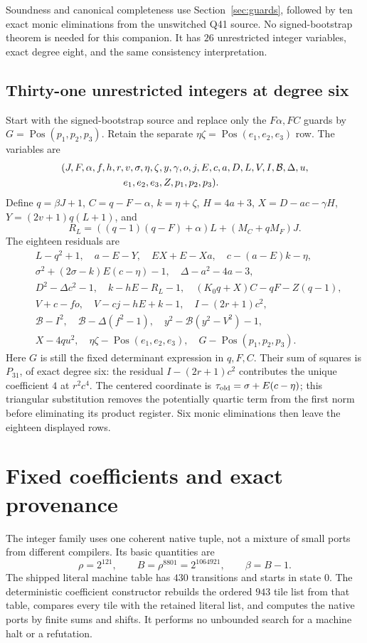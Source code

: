 \documentclass[11pt]{article}
\newcommand{\Pos}{\operatorname{Pos}}
\begin{document}
Soundness and canonical completeness use Section~\ref{sec:guards}, followed
by ten exact monic eliminations from the unswitched Q41 source. No
signed-bootstrap theorem is needed for this companion. It has $26$
unrestricted integer variables, exact degree eight, and the same consistency
interpretation.

\subsection{Thirty-one unrestricted integers at degree six}
Start with the signed-bootstrap source and replace only the $F\alpha,FC$
guards by $G=\Pos(p_1,p_2,p_3)$. Retain the separate
$\eta\zeta=\Pos(e_1,e_2,e_3)$ row. The variables are
\[
\begin{split}
 &(J,F,\alpha,f,h,r,v,\sigma,\eta,\zeta,y,\gamma,o,j,E,c,a,D,L,V,I,\mathcal B,\Delta,u,\\
 &\hspace{22mm}e_1,e_2,e_3,Z,p_1,p_2,p_3).
\end{split}
\]
Define $q=\beta J+1$, $C=q-F-\alpha$, $k=\eta+\zeta$,
$H=4a+3$, $X=D-ac-\gamma H$, $Y=(2v+1)q(L+1)$, and
\[
 R_L=((q-1)(q-F)+\alpha)L+(M_C+qM_F)J.
\]
The eighteen residuals are
\begin{align*}
 &L-q^2+1,\quad a-E-Y,\quad EX+E-Xa,\quad c-(a-E)k-\eta,\\
 &\sigma^2+(2\sigma-k)E(c-\eta)-1,\quad\Delta-a^2-4a-3,\\
 &D^2-\Delta c^2-1,\quad k-hE-R_L-1,\quad
 (K_0q+X)C-qF-Z(q-1),\\
 &V+c-fo,\quad V-cj-hE+k-1,\quad I-(2r+1)c^2,\\
 &\mathcal B-I^2,\quad\mathcal B-\Delta(f^2-1),\quad
 y^2-\mathcal B(y^2-V^2)-1,\\
 &X-4qu^2,\quad\eta\zeta-\Pos(e_1,e_2,e_3),\quad
 G-\Pos(p_1,p_2,p_3).
\end{align*}
Here $G$ is still the fixed determinant expression in $q,F,C$.
Their sum of squares is $P_{31}$, of exact degree six: the residual
$I-(2r+1)c^2$ contributes the unique coefficient $4$ at $r^2c^4$.
The centered coordinate is $\tau_{\rm old}=\sigma+E(c-\eta)$; this
triangular substitution removes the potentially quartic term from the
first norm before eliminating its product register. Six monic eliminations
then leave the eighteen displayed rows.

\section{Fixed coefficients and exact provenance}
\label{sec:coeff}
The integer family uses one coherent native tuple, not a mixture of small
ports from different compilers. Its basic quantities are
\[
 \rho=2^{121},\qquad B=\rho^{8801}=2^{1064921},\qquad\beta=B-1.
\]
The shipped literal machine table has $430$ transitions and starts in state
$0$. The deterministic coefficient constructor rebuilds the ordered $943$
tile list from that table, compares every tile with the retained literal
list, and computes the native ports by finite sums and shifts. It performs
no unbounded search for a machine halt or a refutation.
\end{document}
